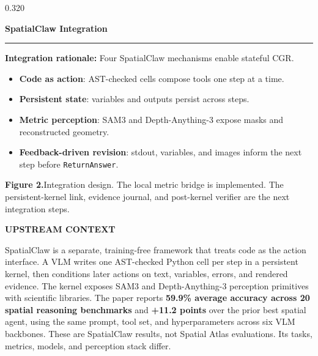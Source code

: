 \documentclass{beamer}
\newenvironment{possection}[2]{%
  \par\vspace{0.10cm}%
  \noindent{\color{ncgreendark}\bfseries\large #1}\hspace{0.42em}%
  {\color{ncink}\bfseries\large #2}\par\vspace{-0.20cm}%
  \noindent\textcolor{ncline}{\rule{\linewidth}{0.9pt}}\par\vspace{0cm}%
  \begin{minipage}{\linewidth}%
}{%
  \end{minipage}\par\vspace{0.40cm}%
}
\newcommand{\heil}[1]{{\color{ncink}\bfseries #1:}\hspace{0.3em}}
\newcommand{\figcap}[2]{%
  \par\vspace{0.18cm}%
  \raggedright{\color{ncmuted}\normalsize\textbf{#1}\hspace{0.3em}#2\par}%
}
\begin{document}
\begin{frame}[t]
\begin{columns}[t,onlytextwidth]
\begin{column}{0.320\textwidth}
\begin{possection}{6.}{SpatialClaw Integration}
\begin{minipage}[t]{0.57\linewidth}
\begin{tikzpicture}
      \end{tikzpicture}
    \end{minipage}\hspace{0.035\linewidth}%
    \begin{minipage}[t]{0.395\linewidth}
      \vspace{0pt}
      \raggedright
      \small
      \heil{Integration rationale} Four SpatialClaw mechanisms enable
      stateful CGR.
      \begin{itemize}
        \setlength{\topsep}{0.08cm}
        \setlength{\itemsep}{0.08cm}
        \setlength{\parsep}{0pt}
        \setlength{\partopsep}{0pt}
        \item \textbf{Code as action}: AST-checked cells compose tools one
              step at a time.
        \item \textbf{Persistent state}: variables and outputs persist across
              steps.
        \item \textbf{Metric perception}: SAM3 and Depth-Anything-3 expose
              masks and reconstructed geometry.
        \item \textbf{Feedback-driven revision}: stdout, variables, and images
              inform the next step before \texttt{ReturnAnswer}.
      \end{itemize}
    \end{minipage}
    \par
    \figcap{Figure 2.}{Integration design. The local metric bridge is implemented.
    The persistent-kernel link, evidence journal, and post-kernel verifier are
    the next integration steps.}
    \par\vspace{0.20cm}
    \begin{takeaway}
      {\ttfamily\footnotesize\bfseries\color{ncgreendark}\MakeUppercase{Upstream context}}\par
      \vspace{0.12cm}
      {\color{ncink}\normalsize SpatialClaw is a separate, training-free
      framework that treats code as the action interface. A VLM writes one
      AST-checked Python cell per step in a persistent kernel, then conditions
      later actions on text, variables, errors, and rendered evidence. The
      kernel exposes SAM3 and Depth-Anything-3 perception primitives with
      scientific libraries. The paper reports \textbf{59.9\% average accuracy
      across 20 spatial reasoning benchmarks} and \textbf{+11.2 points} over
      the prior best spatial agent, using the same prompt, tool set, and
      hyperparameters across six VLM backbones. These are SpatialClaw results,
      not Spatial Atlas evaluations. Its tasks, \mbox{metrics}, models, and
      perception stack differ.}
    \end{takeaway}
  \end{possection}


\end{column}
\end{columns}
\end{frame}
\end{document}
